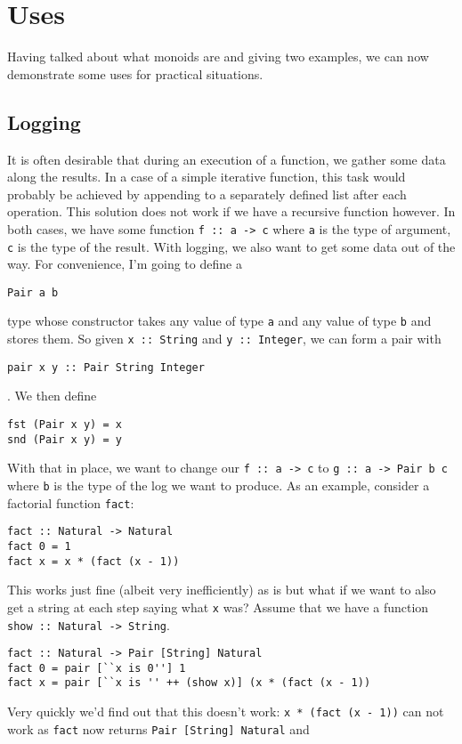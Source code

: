 \documentclass{acm_proc_article-sp}
\begin{document}
\section{Uses}
Having talked about what monoids are and giving two examples, we can now
demonstrate some uses for practical situations.

\subsection{Logging}
It is often desirable that during an execution of a function, we
gather some data along the results. In a case of a simple iterative
function, this task would probably be achieved by appending to a
separately defined list after each operation. This solution does not
work if we have a recursive function however.
In both cases, we have some function \texttt{f :: a -> c} where \texttt{a} is
the type of argument, \texttt{c} is the type of the result. With logging, we
also want to get some data out of the way. For convenience, I'm going
to define a
\begin{lstlisting}
Pair a b
\end{lstlisting} type whose constructor takes any value of type \texttt{a} and any
value of type \texttt{b} and stores them. So given \texttt{x :: String} and \texttt{y ::
Integer}, we can form a pair with
\begin{lstlisting}
pair x y :: Pair String Integer
\end{lstlisting}.
We then define
\begin{lstlisting}
fst (Pair x y) = x
snd (Pair x y) = y
\end{lstlisting}
With that in place, we want to change our \texttt{f :: a -> c} to
\texttt{g :: a -> Pair b c} where \texttt{b} is the type of the log we want to
produce. As an example, consider a factorial function \texttt{fact}:
\begin{lstlisting}
fact :: Natural -> Natural
fact 0 = 1
fact x = x * (fact (x - 1))
\end{lstlisting}
This works just fine (albeit very inefficiently) as is but what if we
want to also get a string at each step saying what \texttt{x} was? Assume
that we have a function \texttt{show :: Natural -> String}.
\begin{lstlisting}
fact :: Natural -> Pair [String] Natural
fact 0 = pair [``x is 0''] 1
fact x = pair [``x is '' ++ (show x)] (x * (fact (x - 1))
\end{lstlisting}
Very quickly we'd find out that this doesn't work: \texttt{x * (fact (x -
1))} can not work as \texttt{fact} now returns \texttt{Pair [String] Natural} and
\end{document}
